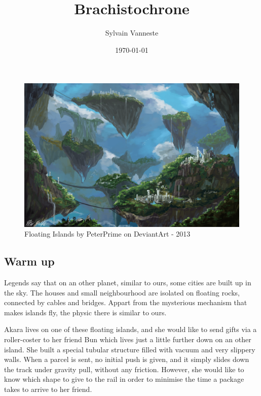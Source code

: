 \documentclass{article}
\title{Brachistochrone}
\author{Sylvain Vanneste}
\date\today
\begin{document}
\maketitle %


\begin{figure}[h]
\begin{center}
\includegraphics[scale=1.1]{../codes/images/FloatingIslands.png}
\end{center}
\caption{Floating Islands by PeterPrime on DeviantArt - 2013}
\end{figure}

\subsection*{Warm up}

Legends say that on an other planet, similar to ours, some cities are built up in the sky. The houses and small neighbourhood are isolated on floating rocks, connected by cables and bridges. Appart from the mysterious mechanism that makes islands fly, the physic there is similar to ours.

Akara lives on one of these floating islands, and she would like to send gifts via a roller-coster to her friend Bun which lives just a little further down on an other island. She built a special tubular structure filled with vacuum and very slippery walls. When a parcel is sent, no initial push is given, and it simply slides down the track under gravity pull, without any friction. However, she would like to know which shape to give to the rail in order to minimise the time a package takes to arrive to her friend.
\end{document}
